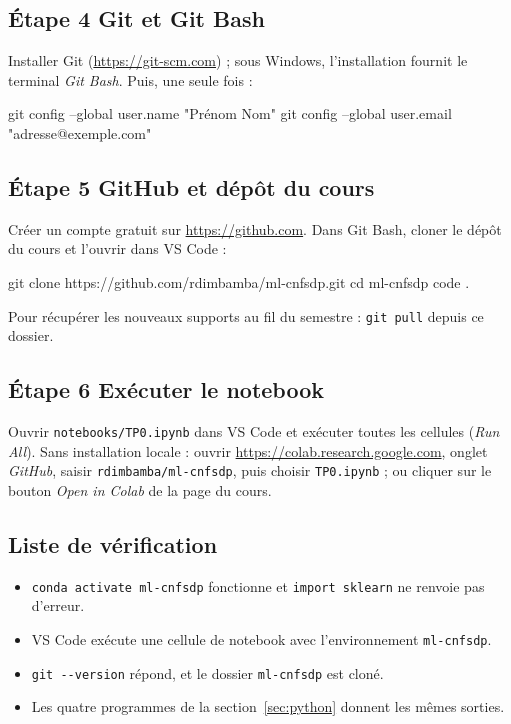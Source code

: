 \subsection*{Étape 4 \textendash{} Git et Git Bash}
Installer Git (\url{https://git-scm.com}) ; sous Windows, l'installation fournit le terminal \emph{Git Bash}. Puis, une seule fois :
\begin{terminal}
git config --global user.name "Prénom Nom"
git config --global user.email "adresse@exemple.com"
\end{terminal}

\subsection*{Étape 5 \textendash{} GitHub et dépôt du cours}
Créer un compte gratuit sur \url{https://github.com}. Dans Git Bash, cloner le dépôt du cours et l'ouvrir dans VS Code :
\begin{terminal}
git clone https://github.com/rdimbamba/ml-cnfsdp.git
cd ml-cnfsdp
code .
\end{terminal}
Pour récupérer les nouveaux supports au fil du semestre : \texttt{git pull} depuis ce dossier.

\subsection*{Étape 6 \textendash{} Exécuter le notebook}
Ouvrir \texttt{notebooks/TP0.ipynb} dans VS Code et exécuter toutes les cellules (\emph{Run All}).
Sans installation locale : ouvrir \url{https://colab.research.google.com}, onglet \emph{GitHub}, saisir \texttt{rdimbamba/ml-cnfsdp}, puis choisir \texttt{TP0.ipynb} ; ou cliquer sur le bouton \emph{Open in Colab} de la page du cours.

\subsection*{Liste de vérification}
\begin{itemize}[label=$\square$]
  \item \texttt{conda activate ml-cnfsdp} fonctionne et \texttt{import sklearn} ne renvoie pas d'erreur.
  \item VS Code exécute une cellule de notebook avec l'environnement \texttt{ml-cnfsdp}.
  \item \texttt{git -{}-version} répond, et le dossier \texttt{ml-cnfsdp} est cloné.
  \item Les quatre programmes de la section~\ref{sec:python} donnent les mêmes sorties.
\end{itemize}

